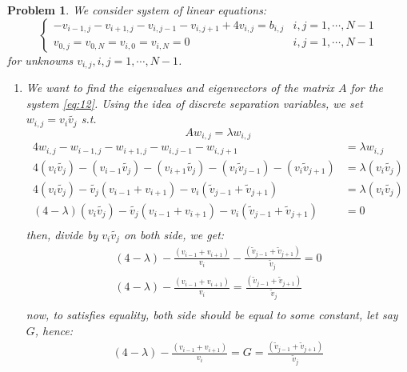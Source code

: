 \documentclass[a4paper,12pt]{article}
\newtheorem{prob}{Problem}[]
\begin{document}
\newpage
\begin{prob}
	We consider system of linear equations:
	\begin{equation}\label{eq:12}
	\begin{cases}
	-v_{i-1,j}-v_{i+1,j}-v_{i,j-1}-v_{i,j+1}+4v_{i,j} = b_{i,j} & i,j = 1,\cdots , N-1\\
	v_{0,j} = v_{0,N} = v_{i,0} = v_{i,N} = 0 & i,j = 1,\cdots , N-1
	\end{cases}
	\end{equation}
	for unknowns $v_{i,j}, i,j = 1,\cdots , N-1$.
	\begin{enumerate}[label=(\alph*)]
		\item We want to find the eigenvalues and eigenvectors of the matrix $A$ for the system \eqref{eq:12}. Using the idea of discrete separation variables, we set $w_{i,j} = v_i \tilde{v_j}$ s.t.
		$$Aw_{i,j} = \lambda w_{i,j}$$
		\begin{equation*}
		\begin{aligned}
		4w_{i,j}-w_{i-1,j}-w_{i+1,j}-w_{i,j-1}-w_{i,j+1} &= \lambda w_{i,j}\\
		4(v_i \tilde{v_j})-(v_{i-1} \tilde{v_j})-(v_{i+1} \tilde{v_j})-(v_i \tilde{v}_{j-1})-(v_i \tilde{v}_{j+1}) &= \lambda (v_i \tilde{v_j})\\
		4(v_i \tilde{v_j}) -\tilde{v_j} (v_{i-1} + v_{i+1}) -v_i( \tilde{v}_{j-1} + \tilde{v}_{j+1}) &= \lambda (v_i \tilde{v_j})\\
		(4-\lambda)(v_i \tilde{v_j}) -\tilde{v_j} (v_{i-1} + v_{i+1}) -v_i( \tilde{v}_{j-1} + \tilde{v}_{j+1}) &= 0\\
		\end{aligned}
		\end{equation*}
		then, divide by $v_i \tilde{v_j}$ on both side, we get:
		\begin{equation*}
		\begin{aligned}
		(4-\lambda) -\frac{(v_{i-1} + v_{i+1})}{v_i} -\frac{( \tilde{v}_{j-1} +\tilde{v}_{j+1})}{\tilde{v}_j} = 0\\
		(4-\lambda) -\frac{(v_{i-1} + v_{i+1})}{v_i} = \frac{( \tilde{v}_{j-1} +\tilde{v}_{j+1})}{\tilde{v}_j}\\
		\end{aligned}
		\end{equation*}
		now, to satisfies equality, both side should be equal to some constant, let say $G$, hence:
		\begin{equation*}
		\begin{aligned}
		(4-\lambda) -\frac{(v_{i-1} + v_{i+1})}{v_i} = G = \frac{( \tilde{v}_{j-1} +\tilde{v}_{j+1})}{\tilde{v}_j}\\
		\end{aligned}
		\end{equation*}
		

\end{enumerate}
\end{prob}
\end{document}
